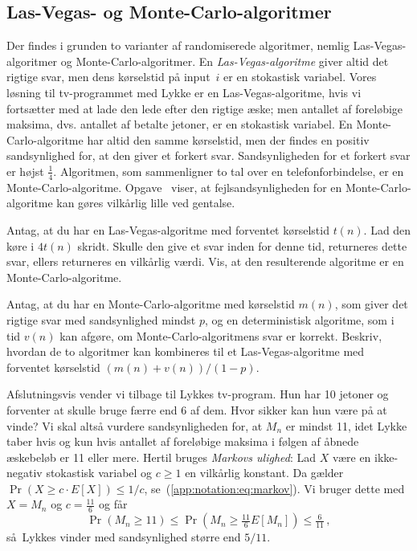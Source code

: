\subsection{Las-Vegas- og Monte-Carlo-algoritmer}

Der findes i grunden to varianter af randomiserede algoritmer, 
nemlig Las-Vegas-algoritmer%
og Monte-Carlo-algoritmer.
En \emph{Las-Vegas-algoritme} giver altid det rigtige svar, men dens kørselstid på input~$i$ er en stokastisk variabel. 
Vores løsning til tv-programmet med Lykke er en Las-Vegas-algoritme, hvis vi fortsætter med at lade den lede efter den rigtige æske;
men antallet af foreløbige maksima, dvs. antallet af betalte jetoner, er en stokastisk variabel.
En Monte-Carlo-algoritme har altid den samme kørselstid, men der findes en positiv sandsynlighed for, at den giver et forkert svar.
Sandsynligheden for et forkert svar er højst $\frac14$.
Algoritmen, som sammenligner to tal over en telefonforbindelse, er en Monte-Carlo-algoritme. 
Opgave~ viser, at fejlsandsynligheden for en Monte-Carlo-algoritme kan gøres vilkårlig lille ved gentalse.  

\begin{exerc}
  Antag, at du har en Las-Vegas-algoritme med forventet kørselstid $t(n)$. 
  Lad den køre i $4t(n)$ skridt.
  Skulle den give et svar inden for denne tid, returneres dette svar, ellers returneres en vilkårlig værdi.
  Vis, at den resulterende algoritme er en Monte-Carlo-algoritme.
\end{exerc}

\begin{exerc}
  Antag, at du har en Monte-Carlo-algoritme med kørselstid $m(n)$, som giver det rigtige svar med sandsynlighed mindst $p$, og en deterministisk algoritme, som i tid $v(n)$ kan afgøre, om Monte-Carlo-algoritmens svar er korrekt.
  Beskriv, hvordan de to algoritmer kan kombineres til et Las-Vegas-algoritme med forventet kørselstid $(m(n)+v(n))/(1-p)$.
\end{exerc}

Afslutningsvis vender vi tilbage til Lykkes tv-program.
Hun har 10 jetoner og forventer at skulle bruge færre end 6 af dem.
Hvor sikker kan hun være på at vinde?
Vi skal altså vurdere sandsynligheden for, at $M_n$ er mindst 11, idet Lykke taber hvis og kun hvis antallet af foreløbige maksima i følgen af åbnede æskebeløb er 11 eller mere.
Hertil bruges \emph{Markovs ulighed}:
Lad $X$ være en ikke-negativ stokastisk variabel og $c\ge 1$ en vilkårlig konstant.
Da gælder $\Pr(X \ge c \cdot E[X])\le 1/c$, se~(\ref{app:notation:eq:markov}).
Vi bruger dette med $X = M_n$ og $c = \frac{11}{6}$ og får
\[ \Pr(M_n \ge 11) \le \Pr(M_n \ge \tfrac{11}{6} E[M_n]) \le \tfrac{6}{11}
\,,\]
så Lykkes vinder med sandsynlighed større end $5/11$.




